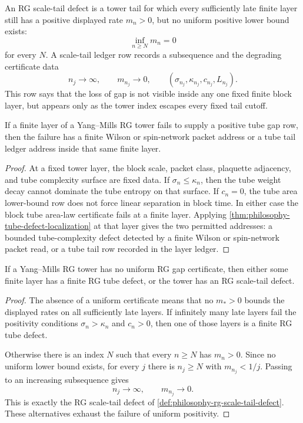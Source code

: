 \begin{definition}
\label{def:philosophy-rg-scale-tail-defect}
An RG scale-tail defect is a tower tail for which every sufficiently late
finite layer still has a positive displayed rate $m_n>0$, but no uniform
positive lower bound exists:
$$
\inf_{n\ge N}m_n=0
$$
for every $N$. A scale-tail ledger row records a subsequence and the
degrading certificate data
$$
n_j\to\infty,\qquad
m_{n_j}\to0,\qquad
(\sigma_{n_j},\kappa_{n_j},c_{n_j},L_{n_j}).
$$
This row says that the loss of gap is not visible inside any one fixed
finite block layer, but appears only as the tower index escapes every fixed
tail cutoff.
\end{definition}

\begin{theorem}
\label{thm:philosophy-finite-rg-tube-defect-visible-or-ledgered}
If a finite layer of a Yang--Mills RG tower fails to supply a positive tube
gap row, then the failure has a finite Wilson or spin-network packet address
or a tube tail ledger address inside that same finite layer.
\end{theorem}
\begin{proof}
At a fixed tower layer, the block scale, packet class, plaquette adjacency,
and tube complexity surface are fixed data. If $\sigma_n\le\kappa_n$, then
the tube weight decay cannot dominate the tube entropy on that surface. If
$c_n=0$, the tube area lower-bound row does not force linear separation in
block time. In either case the block tube area-law certificate fails at a
finite layer. Applying
\autoref{thm:philosophy-tube-defect-localization} at that layer gives the
two permitted addresses: a bounded tube-complexity defect detected by a
finite Wilson or spin-network packet read, or a tube tail row recorded in
the layer ledger.
\end{proof}

\begin{theorem}
\label{thm:philosophy-rg-scale-tail-localization}
If a Yang--Mills RG tower has no uniform RG gap certificate, then either
some finite layer has a finite RG tube defect, or the tower has an RG
scale-tail defect.
\end{theorem}
\begin{proof}
The absence of a uniform certificate means that no $m_{\ast}>0$ bounds the
displayed rates on all sufficiently late layers. If infinitely many late
layers fail the positivity conditions $\sigma_n>\kappa_n$ and $c_n>0$, then
one of those layers is a finite RG tube defect.

Otherwise there is an index $N$ such that every $n\ge N$ has $m_n>0$.
Since no uniform lower bound exists, for every $j$ there is $n_j\ge N$ with
$m_{n_j}<1/j$. Passing to an increasing subsequence gives
$$
n_j\to\infty,\qquad m_{n_j}\to0.
$$
This is exactly the RG scale-tail defect of
\autoref{def:philosophy-rg-scale-tail-defect}. These alternatives exhaust
the failure of uniform positivity.
\end{proof}

